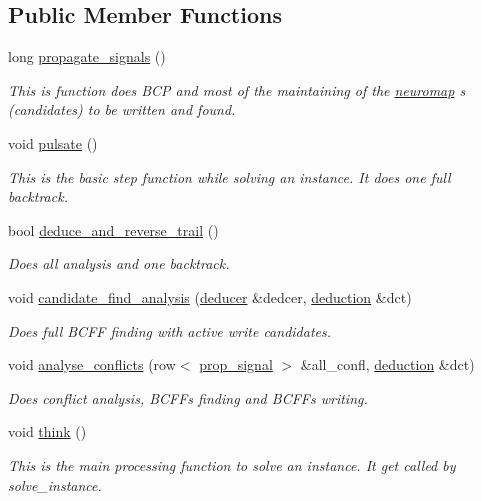 \subsection*{Public Member Functions}
\begin{DoxyCompactItemize}
\item 
long \hyperlink{classbrain_a28eeaf513dd81fcb3dcb21fb37f58ccb}{propagate\+\_\+signals} ()
\begin{DoxyCompactList}\small\item\em This is function does B\+C\+P and most of the maintaining of the \hyperlink{classneuromap}{neuromap} s (candidates) to be written and found. \end{DoxyCompactList}\item 
void \hyperlink{classbrain_a9728a44b4e7b71ddb4a47bb25af05612}{pulsate} ()
\begin{DoxyCompactList}\small\item\em This is the basic step function while solving an instance. It does one full backtrack. \end{DoxyCompactList}\item 
bool \hyperlink{classbrain_a8d880c7f0e91a5dbb2cedaefdb704153}{deduce\+\_\+and\+\_\+reverse\+\_\+trail} ()
\begin{DoxyCompactList}\small\item\em Does all analysis and one backtrack. \end{DoxyCompactList}\item 
void \hyperlink{classbrain_a16dcda6892686c581ca095f51e6a9def}{candidate\+\_\+find\+\_\+analysis} (\hyperlink{classdeducer}{deducer} \&dedcer, \hyperlink{classdeduction}{deduction} \&dct)
\begin{DoxyCompactList}\small\item\em Does full B\+C\+F\+F finding with active write candidates. \end{DoxyCompactList}\item 
void \hyperlink{classbrain_adec5742918fedd1636a6152502bd409c}{analyse\+\_\+conflicts} (row$<$ \hyperlink{classprop__signal}{prop\+\_\+signal} $>$ \&all\+\_\+confl, \hyperlink{classdeduction}{deduction} \&dct)
\begin{DoxyCompactList}\small\item\em Does conflict analysis, B\+C\+F\+Fs finding and B\+C\+F\+Fs writing. \end{DoxyCompactList}\item 
void \hyperlink{classbrain_a8524441f8b863aec8fe2cc9c3ad2d21a}{think} ()
\begin{DoxyCompactList}\small\item\em This is the main processing function to solve an instance. It get called by solve\+\_\+instance. \end{DoxyCompactList}\item 

\end{DoxyCompactItemize}
